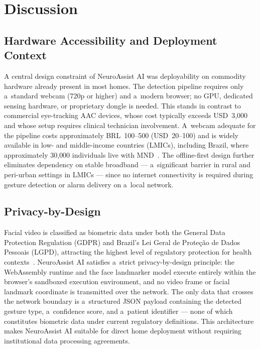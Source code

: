 
\section{Discussion}
\label{sec:discussion}

\subsection{Hardware Accessibility and Deployment Context}

A central design constraint of NeuroAssist AI was deployability on commodity hardware
already present in most homes. The detection pipeline requires only a~standard webcam
(720p or higher) and a~modern browser; no GPU, dedicated sensing hardware, or
proprietary dongle is needed. This stands in contrast to commercial eye-tracking AAC
devices, whose cost typically exceeds USD~3{,}000~\cite{beukelman2013aac} and whose
setup requires clinical technician involvement. A~webcam adequate for the pipeline costs
approximately BRL~100--500 (USD~20--100) and is widely available in low- and
middle-income countries (LMICs), including Brazil, where approximately 30{,}000
individuals live with MND~\cite{mehta2018mnd}. The offline-first design further
eliminates dependency on stable broadband — a~significant barrier in rural and
peri-urban settings in LMICs — since no internet connectivity is required during gesture
detection or alarm delivery on a~local network.

\subsection{Privacy-by-Design}

Facial video is classified as biometric data under both the General Data Protection
Regulation (GDPR) and Brazil's Lei Geral de Prote\c{c}\~{a}o de Dados Pessoais
(LGPD), attracting the highest level of regulatory protection for health
contexts~\cite{edpb2020privacy}. NeuroAssist AI satisfies a~strict
privacy-by-design principle: the WebAssembly runtime and the face landmarker model
execute entirely within the browser's sandboxed execution environment, and no video
frame or facial landmark coordinate is transmitted over the network. The only data that
crosses the network boundary is a~structured JSON payload containing the detected
gesture type, a~confidence score, and a~patient identifier — none of which constitutes
biometric data under current regulatory definitions. This architecture makes NeuroAssist
AI suitable for direct home deployment without requiring institutional data processing
agreements.

